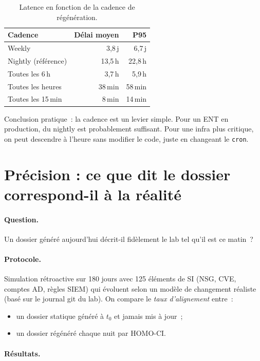 \begin{table}[h]
\centering
\caption{Latence en fonction de la cadence de régénération.}
\label{tab:cadence}
\small
\begin{tabular}{lrr}
\toprule
\textbf{Cadence} & \textbf{Délai moyen} & \textbf{P95} \\
\midrule
Weekly & 3,8\,j & 6,7\,j \\
Nightly (référence) & 13,5\,h & 22,8\,h \\
Toutes les 6\,h & 3,7\,h & 5,9\,h \\
Toutes les heures & 38\,min & 58\,min \\
Toutes les 15\,min & 8\,min & 14\,min \\
\bottomrule
\end{tabular}
\end{table}

Conclusion pratique~: la cadence est un levier simple. Pour un
ENT en production, du nightly est probablement suffisant. Pour
une infra plus critique, on peut descendre à l'heure sans
modifier le code, juste en changeant le \texttt{cron}.

\section{Précision : ce que dit le dossier correspond-il à la réalité}

\paragraph{Question.} Un dossier généré aujourd'hui décrit-il
fidèlement le lab tel qu'il est ce matin~?

\paragraph{Protocole.} Simulation rétroactive sur 180 jours avec
125 éléments de SI (NSG, CVE, comptes AD, règles SIEM) qui
évoluent selon un modèle de changement réaliste (basé sur le
journal git du lab). On compare le \emph{taux d'alignement}
entre~:

\begin{itemize}
  \item un dossier statique généré à $t_0$ et jamais mis à jour~;
  \item un dossier régénéré chaque nuit par HOMO-CI.
\end{itemize}

\paragraph{Résultats.}

